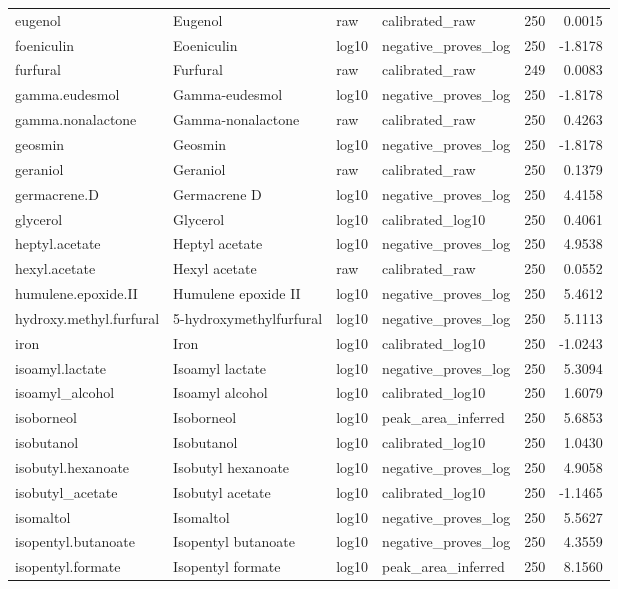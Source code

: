 {\begin{longtable}{llllrr}
eugenol & Eugenol & raw & calibrated\_raw & 250 & 0.0015 \\
foeniculin & Eoeniculin & log10 & negative\_proves\_log & 250 & -1.8178 \\
furfural & Furfural & raw & calibrated\_raw & 249 & 0.0083 \\
gamma.eudesmol & Gamma-eudesmol & log10 & negative\_proves\_log & 250 & -1.8178 \\
gamma.nonalactone & Gamma-nonalactone & raw & calibrated\_raw & 250 & 0.4263 \\
geosmin & Geosmin & log10 & negative\_proves\_log & 250 & -1.8178 \\
geraniol & Geraniol & raw & calibrated\_raw & 250 & 0.1379 \\
germacrene.D & Germacrene D & log10 & negative\_proves\_log & 250 & 4.4158 \\
glycerol & Glycerol & log10 & calibrated\_log10 & 250 & 0.4061 \\
heptyl.acetate & Heptyl acetate & log10 & negative\_proves\_log & 250 & 4.9538 \\
hexyl.acetate & Hexyl acetate & raw & calibrated\_raw & 250 & 0.0552 \\
humulene.epoxide.II & Humulene epoxide II & log10 & negative\_proves\_log & 250 & 5.4612 \\
hydroxy.methyl.furfural & 5-hydroxymethylfurfural & log10 & negative\_proves\_log & 250 & 5.1113 \\
iron & Iron & log10 & calibrated\_log10 & 250 & -1.0243 \\
isoamyl.lactate & Isoamyl lactate & log10 & negative\_proves\_log & 250 & 5.3094 \\
isoamyl\_alcohol & Isoamyl alcohol & log10 & calibrated\_log10 & 250 & 1.6079 \\
isoborneol & Isoborneol & log10 & peak\_area\_inferred & 250 & 5.6853 \\
isobutanol & Isobutanol & log10 & calibrated\_log10 & 250 & 1.0430 \\
isobutyl.hexanoate & Isobutyl hexanoate & log10 & negative\_proves\_log & 250 & 4.9058 \\
isobutyl\_acetate & Isobutyl acetate & log10 & calibrated\_log10 & 250 & -1.1465 \\
isomaltol & Isomaltol & log10 & negative\_proves\_log & 250 & 5.5627 \\
isopentyl.butanoate & Isopentyl butanoate & log10 & negative\_proves\_log & 250 & 4.3559 \\
isopentyl.formate & Isopentyl formate & log10 & peak\_area\_inferred & 250 & 8.1560 \\

\end{longtable}}

